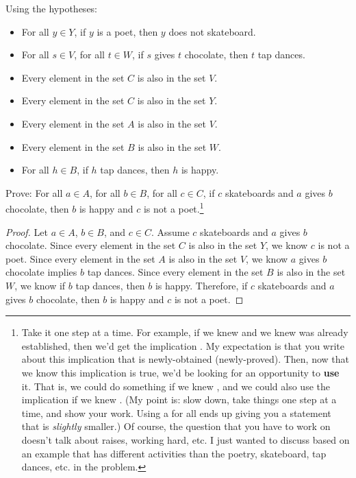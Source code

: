 \documentclass{article}
\begin{document}
\begin{enumerate}
Using the hypotheses:
\begin{itemize}
\item For all $y \in Y$, if $y$ is a poet, then $y$ does not skateboard.
\item For all $s \in V$, for all $t \in W$, if $s$ gives $t$ chocolate, then $t$ tap dances.
\item Every element in the set $C$ is also in the set $V$.
\item Every element in the set $C$ is also in the set $Y$.
\item Every element in the set $A$ is also in the set $V$.
\item Every element in the set $B$ is also in the set $W$.
\item For all $h \in B$, if $h$ tap dances, then $h$ is happy.
\end{itemize}
Prove: For all $a \in A$, for all $b \in B$, for all $c \in C$, if $c$ skateboards and $a$ gives $b$ chocolate, then $b$ is happy and $c$ is not a poet.\footnote{Take it one step at a time. For example, if we knew  and we knew  was already established, then we'd get the implication . My expectation is that you write about this implication that is newly-obtained (newly-proved). Then, now that we know this implication is true, we'd be looking for an opportunity to {\bf use} it. That is, we could do something if we knew , and we could also use the implication if we knew . (My point is: slow down, take things one step at a time, and show your work. Using a for all ends up giving you a statement that is \emph{slightly} smaller.) Of course, the question that you have to work on doesn't talk about raises, working hard, etc. I just wanted to discuss based on an example that has different activities than the poetry, skateboard, tap dances, etc. in the problem.}

\begin{proof}
    Let $a \in A$, $b \in B$, and $c \in C$. Assume $c$ skateboards and $a$ gives $b$ chocolate.
    Since every element in the set $C$ is also in the set $Y$, we know $c$ is not a poet.
    Since every element in the set $A$ is also in the set $V$, we know $a$ gives $b$ chocolate implies $b$ tap dances.
    Since every element in the set $B$ is also in the set $W$, we know if $b$ tap dances, then $b$ is happy.
    Therefore, if $c$ skateboards and $a$ gives $b$ chocolate, then $b$ is happy and $c$ is not a poet.
\end{proof}


\end{enumerate}
\end{document}
